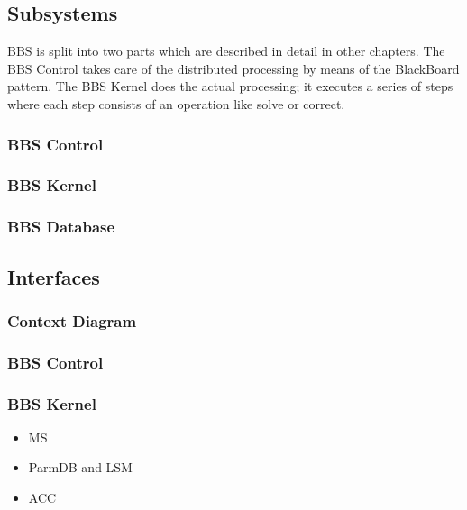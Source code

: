 \documentclass[10pt]{lofar}
\begin{document}
\subsection{Subsystems}
\label{subsec:subsystems}
BBS is split into two parts which are described in detail in other chapters. The
BBS Control takes care of the distributed processing by means of the BlackBoard
pattern. The BBS Kernel does the actual processing; it executes a series of
steps where each step consists of an operation like solve or correct.

\subsubsection{BBS Control}
\label{subsubsec:sys-control}

\subsubsection{BBS Kernel}
\label{subsubsec:sys-kernel}

\subsubsection{BBS Database}
\label{subsubsec:sys-database}

\subsection{Interfaces}
\label{subsec:sys-interfaces}

\subsubsection{Context Diagram}
\label{subsubsec:context}

\subsubsection{BBS Control}
\label{subsubsec:interf-control}

\subsubsection{BBS Kernel}
\label{subsubsec:interf-kernel}
\begin{itemize}
\item MS
\item ParmDB and LSM
\item ACC
\end{itemize}
\end{document}
